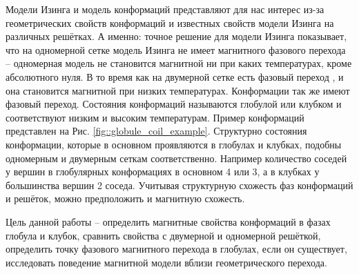 Модели Изинга и модель конформаций представляют для нас интерес из-за геометрических свойств конформаций и известных свойств модели Изинга на различных решётках. А именно: точное решение для модели Изинга \cite{ising_solutions} показывает, что на одномерной сетке модель Изинга не имеет магнитного фазового перехода -- одномерная модель не становится магнитной ни при каких температурах, кроме абсолютного нуля. В то время как на двумерной сетке есть фазовый переход \cite{SAW_polymer_critical}, и она становится магнитной при низких температурах. Конформации так же имеют фазовый переход. Состояния конформаций называются глобулой или клубком и соответствуют низким и высоким температурам. Пример конформаций представлен на Рис. \ref{fig::globule_coil_example}. Структурно состояния конформации, которые в основном проявляются в глобулах и клубках, подобны одномерным и двумерным сеткам соответственно. Например количество соседей у вершин в глобулярных конформациях в основном 4 или 3, а в клубках у большинства вершин 2 соседа. Учитывая структурную схожесть фаз конформаций и решёток, можно предположить и магнитную схожесть.

Цель данной работы -- определить магнитные свойства конформаций в фазах глобула и клубок, сравнить свойства с двумерной и одномерной решёткой, определить точку фазового магнитного перехода в глобулах, если он существует, исследовать поведение магнитной модели вблизи геометрического перехода.